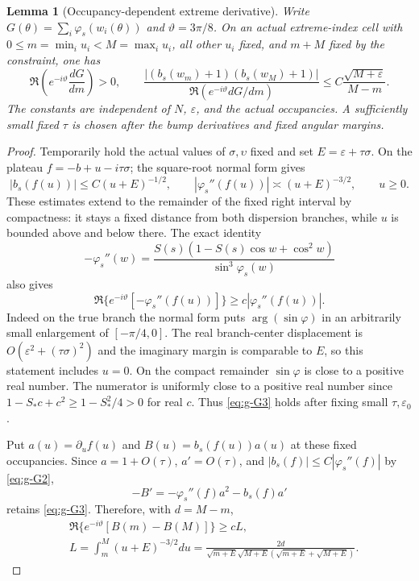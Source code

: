 \documentclass[11pt]{article}
\numberwithin{equation}{section}
\newtheorem{lemma}[theorem]{Lemma}
\theoremstyle{remark}\newtheorem{remark}[theorem]{Remark}
\begin{document}
\begin{lemma}[Occupancy-dependent extreme derivative]\label{lem:global-coarea}
Write
$G(\theta)=\sum_i\varphi_s(w_i(\theta))$ and
$\vartheta=3\pi/8$.  On an actual extreme-index cell with
$0\le m=\min_i u_i<M=\max_i u_i$, all other $u_i$ fixed,
and $m+M$ fixed by the constraint, one has
\begin{equation}\label{eq:g-G1}
\Re\left(e^{-i\vartheta}\frac{dG}{dm}\right)>0,
 \qquad
 \frac{|(b_s(w_m)+1)(b_s(w_M)+1)|}
 {\Re(e^{-i\vartheta}dG/dm)}
 \le C\frac{\sqrt{M+\varepsilon}}{M-m}.
\end{equation}
The constants are independent of $N$, $\varepsilon$, and the
actual occupancies.  A sufficiently small fixed $\tau$ is chosen
after the bump derivatives and fixed angular margins.
\end{lemma}
\begin{proof}
Temporarily hold the actual values of $\sigma,\upsilon$ fixed
and set $E=\varepsilon+\tau\sigma$.
On the plateau $f=-b+u-i\tau\sigma$; the square-root normal form gives
\begin{equation}\label{eq:g-G2}
|b_s(f(u))|\le C(u+E)^{-1/2},\qquad
 |\varphi_s''(f(u))|\asymp(u+E)^{-3/2},\qquad u\ge0.
\end{equation}
These estimates extend to the remainder of the fixed right
interval by compactness: it stays a fixed distance from both
dispersion branches, while $u$ is bounded above and below there.
The exact identity
\[
 -\varphi_s''(w)
 =\frac{S(s)(1-S(s)\cos w+\cos^2w)}{\sin^3\varphi_s(w)}
\]
also gives
\begin{equation}\label{eq:g-G3}
\Re\{e^{-i\vartheta}[-\varphi_s''(f(u))]\}
 \ge c|\varphi_s''(f(u))|.
\end{equation}
Indeed on the true branch the normal form puts
$\arg(\sin\varphi)$ in an arbitrarily small enlargement of
$[-\pi/4,0]$.  The real branch-center displacement is
$O(\varepsilon^2+(\tau\sigma)^2)$ and the imaginary margin is
comparable to $E$, so this statement includes $u=0$.
On the compact remainder $\sin\varphi$ is close to a positive
real number.  The numerator is uniformly close to a positive
real number since
$1-S_*c+c^2\ge1-S_*^2/4>0$ for real $c$.
Thus \eqref{eq:g-G3} holds after fixing small $\tau,\varepsilon_0$.

Put $a(u)=\partial_u f(u)$ and $B(u)=b_s(f(u))a(u)$ at these
fixed occupancies.  Since $a=1+O(\tau)$,
$a'=O(\tau)$, and $|b_s(f)|\le C|\varphi_s''(f)|$ by \eqref{eq:g-G2},
\[
 -B'=-\varphi_s''(f)a^2-b_s(f)a'
\]
retains \eqref{eq:g-G3}.  Therefore, with $d=M-m$,
\begin{equation}\label{eq:g-G4}
\begin{aligned}
 &\Re\{e^{-i\vartheta}[B(m)-B(M)]\}\ge cL,\\
 &L=\int_m^M(u+E)^{-3/2}du
 =\frac{2d}{\sqrt{m+E}\sqrt{M+E}
 (\sqrt{m+E}+\sqrt{M+E})}.
\end{aligned}
\end{equation}


\end{proof}
\end{document}
